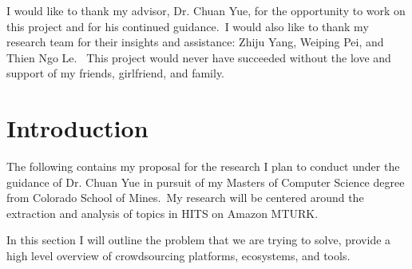 \documentclass[letterpaper,12pt]{article}
\begin{document}
\begin{acknowledgments}
I would like to thank my advisor, Dr. Chuan Yue, for the opportunity to work on this project and for his continued guidance.\
I would also like to thank my research team for their insights and assistance: Zhiju Yang, Weiping Pei, and Thien Ngo Le. \
This project would never have succeeded without the love and support of my friends, girlfriend, and family.
\end{acknowledgments}
\newpage




\bodymatter



\chapter{Introduction}

The following contains my proposal for the research I plan to conduct under the guidance of Dr. Chuan Yue in pursuit of my Masters of Computer Science degree from Colorado School of Mines.\
My research will be centered around the extraction and analysis of topics in HITS on Amazon MTURK. 

In this section I will outline the problem that we are trying to solve, provide a high level overview of crowdsourcing platforms, ecosystems, and tools.
\end{document}
